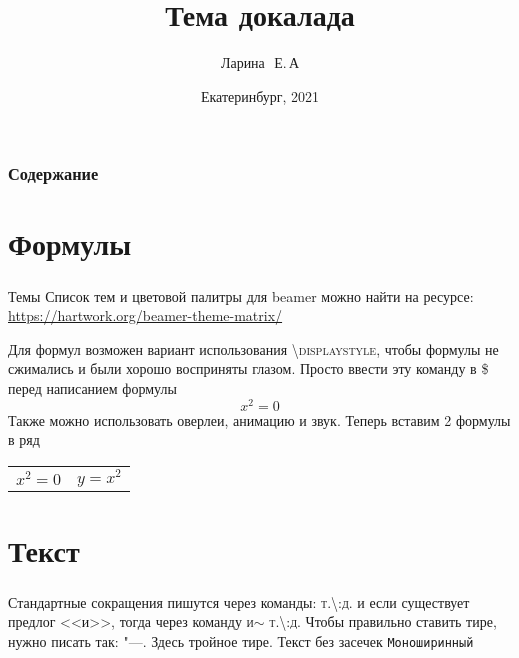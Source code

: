 \documentclass[russian]{beamer}
\title{Тема докалада}
\author{Ларина~\,Е.\,А}
\institute{Уральский Федеральный Университет}
\date{Екатеринбург, 2021}
\begin{document}
\begin{frame}
	\maketitle
	\setcounter{framenumber}{0}
\end{frame}

\begin{frame}
	\frametitle{Содержание}
	\tableofcontents
\end{frame}

\section{Формулы}
\begin{frame}
\frametitle{\insertsection}
\begin{block}{Темы}
Список тем и цветовой палитры для beamer можно найти на ресурсе:\newline
\href{https://hartwork.org/beamer-theme-matrix/}{https://hartwork.org/beamer-theme-matrix/}
\end{block}
Для формул возможен вариант использования \textsc{\textbackslash displaystyle}, чтобы формулы не сжимались и были хорошо восприняты глазом.\newline
Просто ввести эту команду в \textsc{\$} перед написанием формулы
$$
	x^2=0
$$
Также можно использовать оверлеи, анимацию и звук.\newline
Теперь вставим 2 формулы в ряд\newline
\begin{center}
\begin{tabular}{cc}
$x^2=0$ & $y=x^2$
\end{tabular}
\end{center}
\end{frame}

\section{Текст}
\begin{frame}
	\frametitle{\insertsection}
	Стандартные сокращения пишутся через команды: \textsc{т.\textbackslash:д.} и если существует предлог <<и>>, тогда через команду \textsc{и$\sim$ т.\textbackslash:д.}\newline
Чтобы правильно ставить тире, нужно писать так: \textsc{"---}. Здесь тройное тире.\newline
\textsf{Текст без засечек}\newline
\texttt{Моноширинный}\newline
{}\newline
{}
\end{frame}
\end{document}
